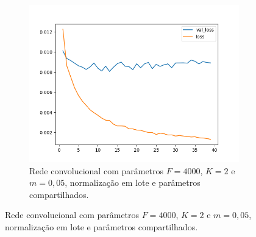 \begin{figure}[H]
\begin{subfigure}{.5\textwidth}
  \label{fig:cnn-4000-k-2-m-005-normalizacao-em-lote-v2}
\end{subfigure}
\begin{subfigure}{.5\textwidth}
  \centering
  \caption{Rede convolucional com parâmetros $F = 4000$, $K = 2$ e $m = 0,05$, normalização em lote e parâmetros compartilhados.}
  \includegraphics[width=.8\linewidth]{figuras/ape-ajustes-hiper-parametros/shared-cnn-with-bn-4000-k-2-m-005.png}
  
  \label{fig:shared-cnn-4000-k-2-m-005-normalizacao-em-lote}
\end{subfigure}

\label{fig:treinamento-shared-cnn}
\end{figure}


